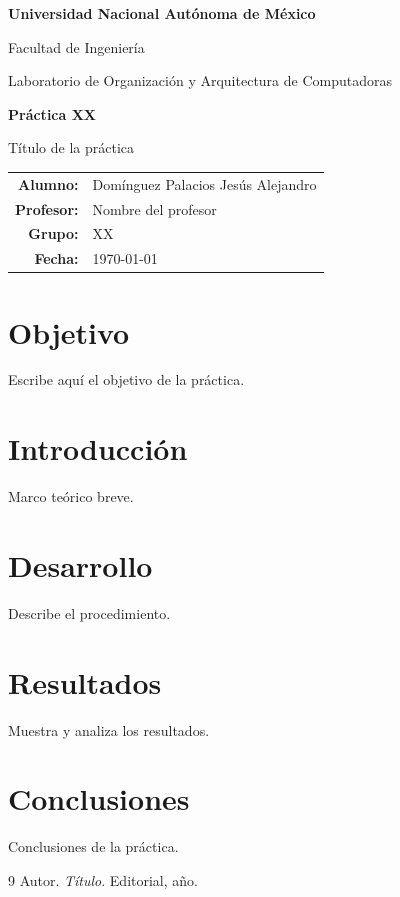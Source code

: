 \documentclass[12pt,letterpaper]{article}
\newcommand{\numpractica}{XX}
\newcommand{\titulopractica}{Título de la práctica}
\newcommand{\fechaentrega}{\today}
\newcommand{\autor}{Domínguez Palacios Jesús Alejandro}
\newcommand{\profesor}{Nombre del profesor}
\newcommand{\grupo}{XX}
\begin{document}
\begin{titlepage}
  \centering
  {\Large \textbf{Universidad Nacional Autónoma de México}\par}
  \vspace{0.3cm}
  {\large Facultad de Ingeniería\par}
  \vspace{1.5cm}
  {\large Laboratorio de Organización y Arquitectura de Computadoras\par}
  \vspace{2cm}
  {\LARGE \textbf{Práctica \numpractica}\par}
  \vspace{0.5cm}
  {\Large \titulopractica\par}
  \vfill
  \begin{tabular}{rl}
    \textbf{Alumno:}   & \autor \\
    \textbf{Profesor:} & \profesor \\
    \textbf{Grupo:}    & \grupo \\
    \textbf{Fecha:}    & \fechaentrega \\
  \end{tabular}
\end{titlepage}

\tableofcontents
\newpage

\section{Objetivo}
Escribe aquí el objetivo de la práctica.

\section{Introducción}
Marco teórico breve.

\section{Desarrollo}
Describe el procedimiento.



\section{Resultados}
Muestra y analiza los resultados.

\section{Conclusiones}
Conclusiones de la práctica.

\begin{thebibliography}{9}
   Autor. \textit{Título}. Editorial, año.
\end{thebibliography}
\end{document}
